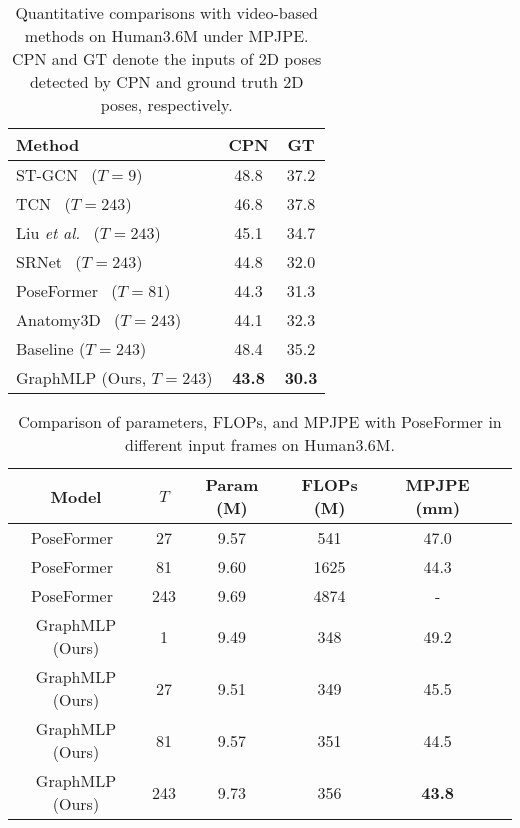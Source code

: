 \documentclass[lettersize,journal]{IEEEtran}
\begin{document}
\begin{table}[t]
\centering
\caption
{ 
Quantitative comparisons with video-based methods on Human3.6M under MPJPE.
CPN and GT denote the inputs of 2D poses detected by CPN and ground truth 2D poses, respectively. 
}
\setlength{\tabcolsep}{6.60mm} 
\begin{tabular}{l|cc}
\toprule [1pt]
Method &CPN &GT \\
\midrule [0.5pt]
ST-GCN~\cite{stgcn} ($T {=} 9$) &48.8 &37.2 \\
TCN~\cite{videopose} ($T{=}243$) &46.8 &37.8 \\
Liu \emph{et al.}~\cite{liu2020attention} ($T{=}243$) &45.1 &34.7 \\
SRNet~\cite{zeng2020srnet} ($T{=}243$) &44.8 &32.0 \\
PoseFormer~\cite{poseformer} ($T{=}81$) &44.3 &31.3 \\
Anatomy3D~\cite{chen2021anatomy} ($T{=}243$) &44.1 &32.3 \\
\midrule [0.5pt]
Baseline ($T{=}243$) &48.4 &35.2 \\

GraphMLP (Ours, $T{=}243$) &\textbf{43.8} &\textbf{30.3} \\

\toprule [1pt]
\end{tabular}
\label{table:video}
\end{table}

\begin{table}[t]
\centering
\caption
{ 
  Comparison of parameters, FLOPs, and MPJPE  with PoseFormer in different input frames on Human3.6M. 
}  
\setlength{\tabcolsep}{0.60mm} 
\begin{tabular}{c|ccccc}
\toprule [1pt]
Model &$T$ &Param (M) &FLOPs (M) &MPJPE (mm) \\
\midrule [0.5pt]  
PoseFormer~\cite{poseformer} &27 &9.57 &541 &47.0 \\
PoseFormer~\cite{poseformer} &81 &9.60 &1625 &44.3 \\
PoseFormer~\cite{poseformer} &243 &9.69 &4874 &- \\
\midrule [0.5pt]

GraphMLP (Ours) &1 &9.49 &348 &49.2 & \\
GraphMLP (Ours) &27 &9.51 &349 &45.5 & \\
GraphMLP (Ours) &81 &9.57 &351 &44.5 & \\
GraphMLP (Ours) &243 &9.73 &356 &\textbf{43.8} & \\

\toprule [1pt]
\end{tabular}
\label{table:poseformer}
\end{table}
\end{document}

